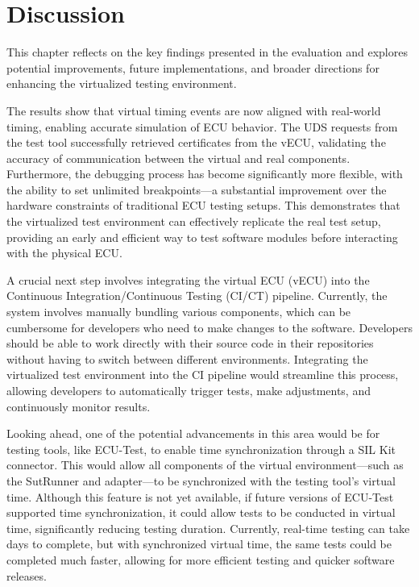
\chapter{Discussion}\label{chapter:discussion}



This chapter reflects on the key findings presented in the evaluation and explores potential improvements, future implementations, and broader directions for enhancing the virtualized testing environment.

The results show that virtual timing events are now aligned with real-world timing, enabling accurate simulation of ECU behavior. The UDS requests from the test tool successfully retrieved certificates from the vECU, validating the accuracy of communication between the virtual and real components. Furthermore, the debugging process has become significantly more flexible, with the ability to set unlimited breakpoints—a substantial improvement over the hardware constraints of traditional ECU testing setups. This demonstrates that the virtualized test environment can effectively replicate the real test setup, providing an early and efficient way to test software modules before interacting with the physical ECU.

A crucial next step involves integrating the virtual ECU (vECU) into the Continuous Integration/Continuous Testing (CI/CT) pipeline. Currently, the system involves manually bundling various components, which can be cumbersome for developers who need to make changes to the software. Developers should be able to work directly with their source code in their repositories without having to switch between different environments. Integrating the virtualized test environment into the CI pipeline would streamline this process, allowing developers to automatically trigger tests, make adjustments, and continuously monitor results.

Looking ahead, one of the potential advancements in this area would be for testing tools, like ECU-Test, to enable time synchronization through a SIL Kit connector. This would allow all components of the virtual environment—such as the SutRunner and adapter—to be synchronized with the testing tool's virtual time. Although this feature is not yet available, if future versions of ECU-Test supported time synchronization, it could allow tests to be conducted in virtual time, significantly reducing testing duration. Currently, real-time testing can take days to complete, but with synchronized virtual time, the same tests could be completed much faster, allowing for more efficient testing and quicker software releases. 
